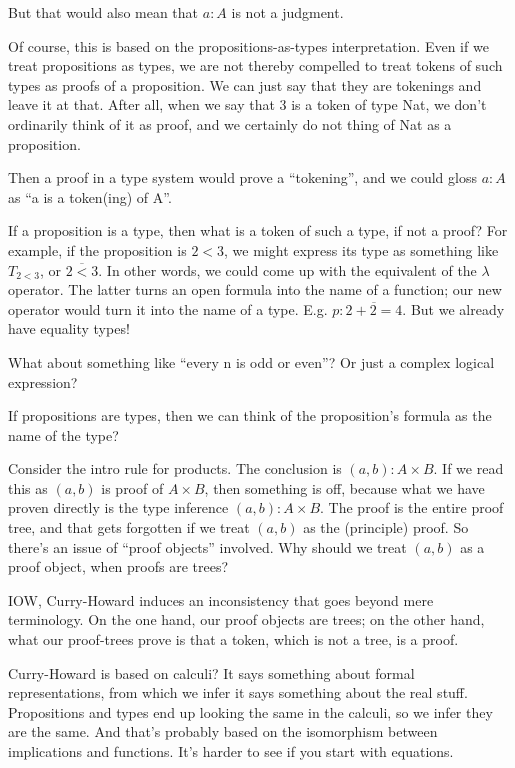 \documentclass{article}
\begin{document}
But that would also mean that \(a:A\) is not a judgment.

Of course, this is based on the propositions-as-types interpretation.
Even if we treat propositions as types, we are not thereby compelled
to treat tokens of such types as proofs of a proposition. We can just
say that they are tokenings and leave it at that. After all, when we
say that 3 is a token of type Nat, we don't ordinarily think of it as
proof, and we certainly do not thing of Nat as a proposition.

Then a proof in a type system would prove a ``tokening'', and we could
gloss \(a:A\) as ``a is a token(ing) of A''.

If a proposition is a type, then what is a token of such a type, if
not a proof? For example, if the proposition is \(2<3\), we might
express its type as something like \(T_{2<3}\), or \(\overline{2<3}\).
In other words, we could come up with the equivalent of the
\(\lambda\) operator. The latter turns an open formula into the name
of a function; our new operator would turn it into the name of a type.
E.g. \(p: \overline{2+2=4}\).  But we already have equality types!

What about something like ``every n is odd or even''? Or just a
complex logical expression?

If propositions are types, then we can think of the proposition's
formula as the name of the type?

Consider the intro rule for products. The conclusion is
\((a,b):A\times B\). If we read this as \((a,b)\) is proof of
\(A\times B\), then something is off, because what we have proven
directly is the type inference \((a,b):A\times B\). The proof is the
entire proof tree, and that gets forgotten if we treat \((a,b)\) as
the (principle) proof. So there's an issue of ``proof objects''
involved. Why should we treat \((a,b)\) as a proof object, when proofs
are trees?

IOW, Curry-Howard induces an inconsistency that goes beyond mere
terminology. On the one hand, our proof objects are trees; on the
other hand, what our proof-trees prove is that a token, which is not a
tree, is a proof.

Curry-Howard is based on calculi? It says something about formal
representations, from which we infer it says something about the real
stuff. Propositions and types end up looking the same in the calculi,
so we infer they are the same. And that's probably based on the
isomorphism between implications and functions. It's harder to see if
you start with equations.
\end{document}

